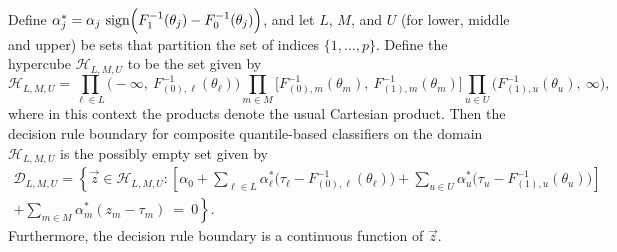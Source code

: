 \begin{proposition}
  \label{lem:decision-rule-form}
  Define
  $\alpha_j^{*} = \alpha_j\, \operatorname{sign}\!\Big(F_1^{-1}(\theta_j) -
  F_0^{-1}(\theta_j)\Big)$, and let $L$, $M$, and $U$ (for lower, middle and
  upper) be sets that partition the set of indices $\{1, \dots, p\}$.  Define
  the hypercube $\mathcal{H}_{L,M,U}$ to be the set given by
  \begin{equation}
    \mathcal{H}_{L,M,U} = 
    \prod_{{\ell} \in L} \big( -\infty,~ F_{(0),{\ell}}^{-1}(\theta_{\ell}) \big)
    \prod_{m \in M} \big[ F_{(0),m}^{-1}(\theta_m),~ F_{(1),m}^{-1}(\theta_m) \big]
    \prod_{u \in U} \big( F_{(1),u}^{-1}(\theta_{u}),~ \infty \big),
  \end{equation}
  where in this context the products denote the usual Cartesian product.  Then
  the decision rule boundary for composite quantile-based classifiers on the
  domain $\mathcal{H}_{L,M,U}$ is the possibly empty set given by
  \begin{equation}
    \label{eq:composite-classifiers-general}
    \begin{split}
      \mathcal{D}_{L,M,U} = \left\{
        \vec{z} \in
        \mathcal{H}_{L,M,U}:
        \left[
          \alpha_0 + 
          \sum_{{\ell} \in L} \alpha_{\ell}^{*} \Big(\tau_{\ell} - F_{(0),{\ell}}^{-1}(\theta_{\ell})\Big) +
          \sum_{u \in U} \alpha_{u}^{*} \Big(\tau_{u} - F_{(1),u}^{-1}(\theta_{u})\Big)
        \right]
      \right. \\[1ex]
      \left.
        + \sum_{m \in M} \alpha_m^{*} (z_m - \tau_m) ~=~ 0
      \right\} .
    \end{split}
  \end{equation}
  Furthermore, the decision rule boundary is a continuous function of $\vec{z}$.
  
\end{proposition}





